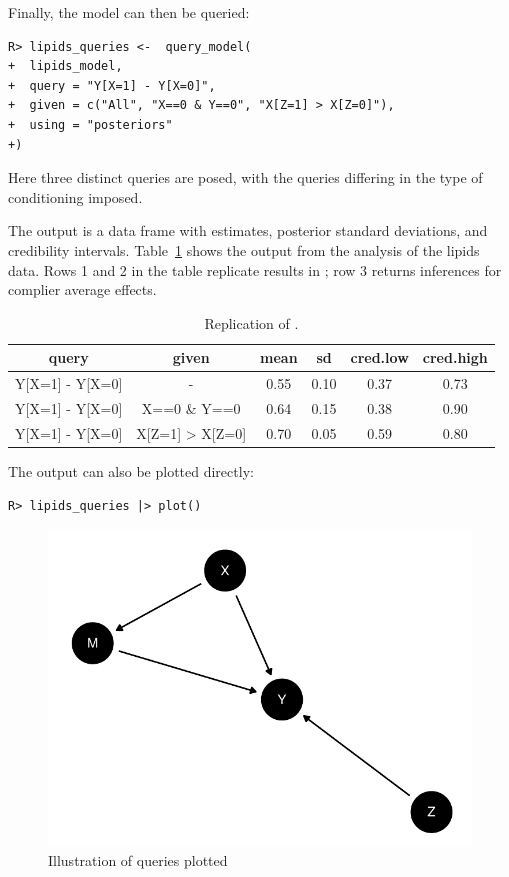 \documentclass[
  11pt,
  article]{jss}
\begin{document}
Finally, the model can then be queried:

\begin{verbatim}
R> lipids_queries <-  query_model(
+  lipids_model,
+  query = "Y[X=1] - Y[X=0]",
+  given = c("All", "X==0 & Y==0", "X[Z=1] > X[Z=0]"),
+  using = "posteriors"
+)
\end{verbatim}

Here three distinct queries are posed, with the queries differing in the
type of conditioning imposed.

The output is a data frame with estimates, posterior standard
deviations, and credibility intervals. Table~\ref{tbl-lipids} shows the
output from the analysis of the lipids data. Rows 1 and 2 in the table
replicate results in \citet{chickering_clinicians_1996}; row 3 returns
inferences for complier average effects.

\begin{longtable}[t]{cccccc}

\caption{\label{tbl-lipids}Replication of
\citet{chickering_clinicians_1996}.}

\tabularnewline

\toprule
query & given & mean & sd & cred.low & cred.high\\
\midrule
Y[X=1] - Y[X=0] & - & 0.55 & 0.10 & 0.37 & 0.73\\
Y[X=1] - Y[X=0] & X==0 \& Y==0 & 0.64 & 0.15 & 0.38 & 0.90\\
Y[X=1] - Y[X=0] & X[Z=1] > X[Z=0] & 0.70 & 0.05 & 0.59 & 0.80\\
\bottomrule

\end{longtable}

The output can also be plotted directly:

\begin{verbatim}
R> lipids_queries |> plot()
\end{verbatim}

\begin{figure}[H]

{\centering \includegraphics{paper_files/figure-pdf/unnamed-chunk-7-1.pdf}

}

\caption{Illustration of queries plotted}

\end{figure}%
\end{document}
